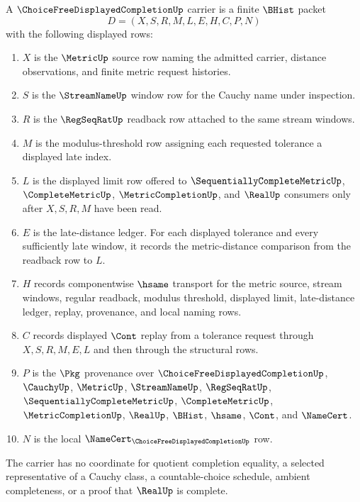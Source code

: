 \begin{definition}
\label{def:choice-free-displayed-completion-carrier}
A $\ChoiceFreeDisplayedCompletionUp$ carrier is a finite $\BHist$ packet
$$
D=(X,S,R,M,L,E,H,C,P,N)
$$
with the following displayed rows:
\begin{enumerate}
\item $X$ is the $\MetricUp$ source row naming the admitted carrier, distance observations, and finite metric request histories.
\item $S$ is the $\StreamNameUp$ window row for the Cauchy name under inspection.
\item $R$ is the $\RegSeqRatUp$ readback row attached to the same stream windows.
\item $M$ is the modulus-threshold row assigning each requested tolerance a displayed late index.
\item $L$ is the displayed limit row offered to $\SequentiallyCompleteMetricUp$, $\CompleteMetricUp$, $\MetricCompletionUp$, and $\RealUp$ consumers only after $X,S,R,M$ have been read.
\item $E$ is the late-distance ledger. For each displayed tolerance and every sufficiently late window, it records the metric-distance comparison from the readback row to $L$.
\item $H$ records componentwise $\hsame$ transport for the metric source, stream windows, regular readback, modulus threshold, displayed limit, late-distance ledger, replay, provenance, and local naming rows.
\item $C$ records displayed $\Cont$ replay from a tolerance request through $X,S,R,M,E,L$ and then through the structural rows.
\item $P$ is the $\Pkg$ provenance over $\ChoiceFreeDisplayedCompletionUp$, $\CauchyUp$, $\MetricUp$, $\StreamNameUp$, $\RegSeqRatUp$, $\SequentiallyCompleteMetricUp$, $\CompleteMetricUp$, $\MetricCompletionUp$, $\RealUp$, $\BHist$, $\hsame$, $\Cont$, and $\NameCert$.
\item $N$ is the local $\NameCert_{\ChoiceFreeDisplayedCompletionUp}$ row.
\end{enumerate}
The carrier has no coordinate for quotient completion equality, a selected representative of a Cauchy class, a countable-choice schedule, ambient completeness, or a proof that $\RealUp$ is complete.
\end{definition}

